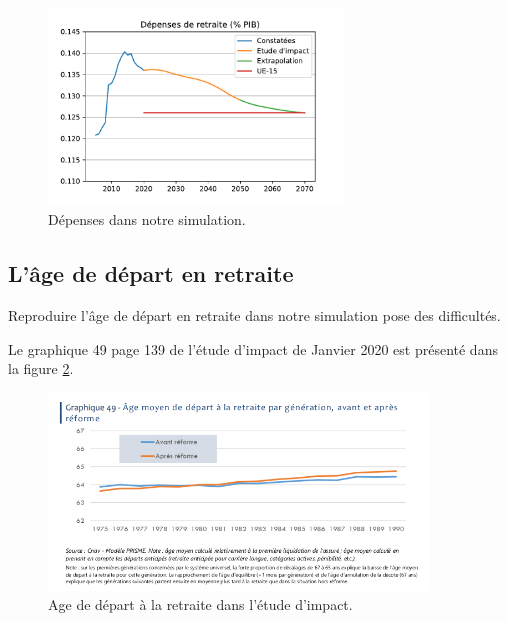 \documentclass[10pt]{article}
\begin{document}
\begin{figure}
\begin{center}
\includegraphics[width=0.7\textwidth]{Simulation-Depenses.pdf}
\end{center}
\caption{Dépenses dans notre simulation.}
\label{fig-dépenses-simulation}
\end{figure}


\subsection{L'âge de départ en retraite}

Reproduire l'âge de départ en retraite dans notre simulation 
pose des difficultés. 

Le graphique 49 page 139 de l'étude d'impact de Janvier 2020 est présenté 
dans la figure \ref{fig-age-etude-impact}.

\begin{figure}
\begin{center}
\includegraphics[width=0.9\textwidth]{EtudeImpact-AgeDepartRetraite.png}
\end{center}
\caption{Age de départ à la retraite dans l'étude d'impact.}
\label{fig-age-etude-impact}
\end{figure}
\end{document}
